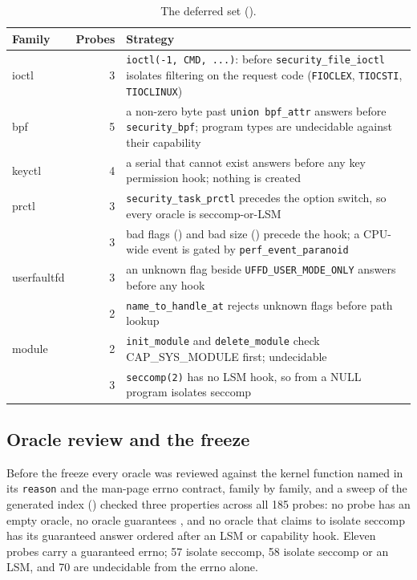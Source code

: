 \begin{table}[htbp]
\centering\footnotesize
\begin{tabularx}{\textwidth}{@{}P{2.7cm}rL@{}}
\toprule
\textbf{Family} & \textbf{Probes} & \textbf{Strategy} \\
\midrule
ioctl & 3 & \texttt{ioctl(-1, CMD, ...)}:  before \texttt{security\_file\_ioctl} isolates filtering on the request code (\texttt{FIOCLEX}, \texttt{TIOCSTI}, \texttt{TIOCLINUX}) \\
bpf & 5 & a non-zero byte past \texttt{union bpf\_attr} answers  before \texttt{security\_bpf}; program types are undecidable against their capability \\
keyctl & 4 & a serial that cannot exist answers  before any key permission hook; nothing is created \\
prctl & 3 & \texttt{security\_task\_prctl} precedes the option switch, so every  oracle is seccomp-or-LSM \\
 & 3 & bad flags () and bad size () precede the hook; a CPU-wide event is gated by \texttt{perf\_event\_paranoid} \\
userfaultfd & 3 & an unknown flag beside \texttt{UFFD\_USER\_MODE\_ONLY} answers  before any hook \\
 & 2 & \texttt{name\_to\_handle\_at} rejects unknown flags before path lookup \\
module & 2 & \texttt{init\_module} and \texttt{delete\_module} check CAP\_SYS\_MODULE first; undecidable \\
 & 3 & \texttt{seccomp(2)} has no LSM hook, so  from a NULL program isolates seccomp \\
\bottomrule
\end{tabularx}
\caption{The deferred set ().}
\label{tab:deferred}
\end{table}

\subsection{Oracle review and the freeze}
Before the freeze every oracle was reviewed against the kernel function named in its \texttt{reason} and the man-page errno contract, family by family, and a sweep of the generated index () checked three properties across all 185 probes: no probe has an empty oracle, no oracle guarantees , and no oracle that claims to isolate seccomp has its guaranteed answer ordered after an LSM or capability hook. Eleven probes carry a guaranteed errno; 57 isolate seccomp, 58 isolate seccomp or an LSM, and 70 are undecidable from the errno alone.

